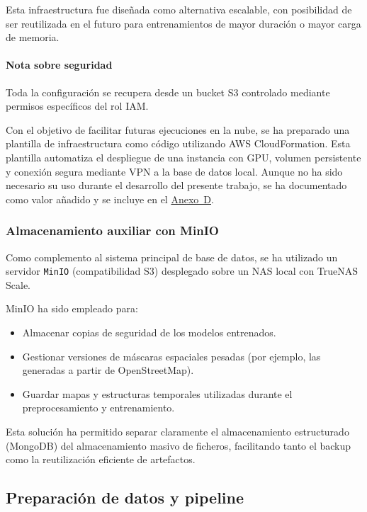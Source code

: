 Esta infraestructura fue diseñada como alternativa escalable, con posibilidad de ser reutilizada en el futuro para entrenamientos de mayor duración o mayor carga de memoria.

\paragraph*{Nota sobre seguridad} 

Toda la configuración se recupera desde un bucket S3 controlado mediante permisos específicos del rol IAM.

Con el objetivo de facilitar futuras ejecuciones en la nube, se ha preparado una plantilla de infraestructura como código utilizando AWS CloudFormation. Esta plantilla automatiza el despliegue de una instancia con GPU, volumen persistente y conexión segura mediante VPN a la base de datos local. Aunque no ha sido necesario su uso durante el desarrollo del presente trabajo, se ha documentado como valor añadido y se incluye en el \hyperref[anexo:plantilla_aws]{Anexo~D}.

\subsubsection*{Almacenamiento auxiliar con MinIO}

Como complemento al sistema principal de base de datos, se ha utilizado un servidor \texttt{MinIO} (compatibilidad S3) desplegado sobre un NAS local con TrueNAS Scale.

MinIO ha sido empleado para:

\begin{itemize}
	\item Almacenar copias de seguridad de los modelos entrenados.
	\item Gestionar versiones de máscaras espaciales pesadas (por ejemplo, las generadas a partir de OpenStreetMap).
	\item Guardar mapas y estructuras temporales utilizadas durante el preprocesamiento y entrenamiento.
\end{itemize}

Esta solución ha permitido separar claramente el almacenamiento estructurado (MongoDB) del almacenamiento masivo de ficheros, facilitando tanto el backup como la reutilización eficiente de artefactos.


\subsection{Preparación de datos y pipeline}
\label{sec:prep_datos_pipeline}

